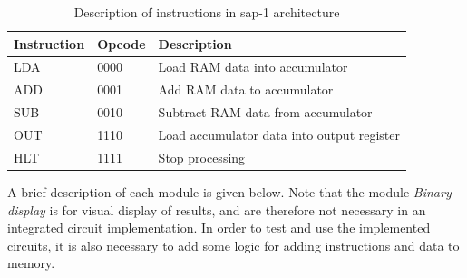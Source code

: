 \begin{table}[hbpt]
    \centering
    \caption{\label{tab:sap1instr}Description of instructions in \gls{sap-1} architecture}
    \begin{tabular}{lll}
      \textbf{Instruction} & \textbf{Opcode} & \textbf{Description} \\
      \toprule
      LDA & 0000 & Load RAM data into accumulator \\
      \hline
      ADD & 0001 & Add RAM data to accumulator \\
      \hline
      SUB & 0010 & Subtract RAM data from accumulator \\
      \hline
      OUT & 1110 & Load accumulator data into output register \\
      \hline
      HLT & 1111 & Stop processing\\
      \bottomrule
    \end{tabular}
\end{table}
\noindent
A brief description of each module is given below. Note that the module \textit{Binary display} is for visual display of results, and are therefore not necessary in an integrated circuit implementation. In order to test and use the implemented circuits, it is also necessary to add some logic for adding instructions and data to memory.

